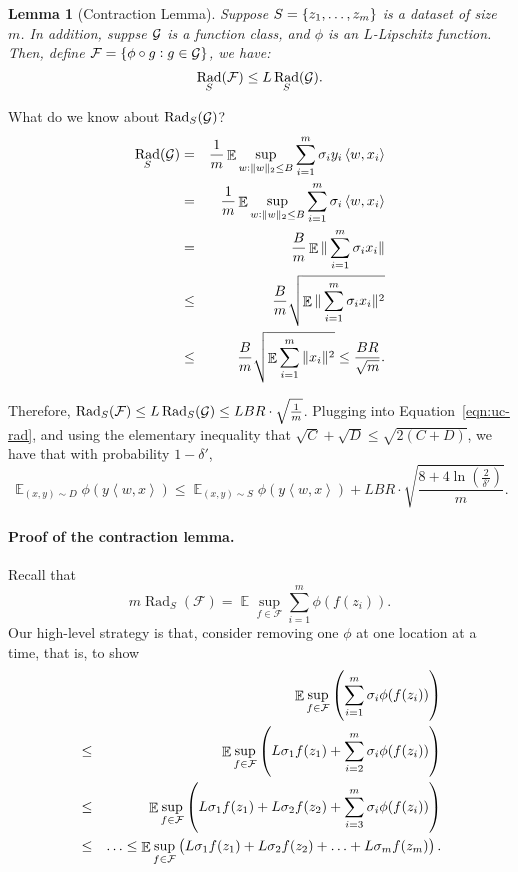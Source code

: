 \documentclass{article}
\newtheorem{lemma}{Lemma}
\DeclareMathOperator{\Rad}{{\mathrm{Rad}}}
\DeclareMathOperator*{\R}{{\rm R}}
\DeclareMathOperator*{\Gcal}{{\cal G}}
\DeclareMathOperator*{\EE}{{\mathbb E}}
\newcommand{\Fcal}{\mathcal{F}}
\newcommand{\inner}[2]{\left\langle #1,#2 \right\rangle}
\begin{document}
\begin{lemma}[Contraction Lemma]
Suppose $S = \cbr{z_1,\ldots,z_m}$ is a dataset of size $m$. In addition, suppse $\Gcal$ is a function class, and $\phi$ is an $L$-Lipschitz function. Then, define $\Fcal = \cbr{\phi \circ g: g \in \Gcal}$, we have:
\[ \Rad_S(\Fcal) \leq L \Rad_S(\Gcal). \]
\end{lemma}

What do we know about $\Rad_S(\Gcal)$?
\begin{eqnarray*}
\Rad_S(\Gcal)
&=& \frac{1}{m} \EE \sup_{w: \|w\|_2 \leq B} \sum_{i=1}^m \sigma_i y_i \inner{w}{x_i} \\
&=& \frac{1}{m} \EE \sup_{w: \|w\|_2 \leq B} \sum_{i=1}^m \sigma_i \inner{w}{x_i} \\
&=& \frac{B}{m} \EE \| \sum_{i=1}^m \sigma_i x_i \| \\
&\leq& \frac{B}{m} \sqrt{\EE \| \sum_{i=1}^m \sigma_i x_i \|^2} \\
&\leq& \frac{B}{m} \sqrt{\EE \sum_{i=1}^m \| x_i \|^2} \leq \frac{BR}{\sqrt{m}}.
\end{eqnarray*}

Therefore, $\Rad_S(\Fcal) \leq L \Rad_S(\Gcal) \leq LBR \cdot \sqrt{\frac1m}$. Plugging into Equation~\eqref{eqn:uc-rad}, and using the elementary inequality that $\sqrt{C}+\sqrt{D} \leq \sqrt{2(C+D)}$, we have that with probability $1-\delta'$,
\begin{equation}
\EE_{(x,y) \sim D} \phi(y \inner{w}{x})
\leq \EE_{(x,y) \sim S} \phi(y \inner{w}{x})
+ L B R \cdot \sqrt{\frac{8 + 4\ln(\frac{2}{\delta'})}{m}}.
\label{eqn:uc-lip}
\end{equation}



\paragraph{Proof of the contraction lemma.} Recall that
\[ m \Rad_S(\Fcal) = \EE \sup_{f \in \Fcal} \sum_{i=1}^m \phi(f(z_i)). \]
Our high-level strategy is that, consider removing one $\phi$ at one location at a time, that is, to show
\begin{eqnarray*}
  && \EE \sup_{f \in \Fcal} \del{\sum_{i=1}^m \sigma_i \phi(f(z_i))}\\
  &\leq& \EE \sup_{f \in \Fcal} \del{L \sigma_1 f(z_1) + \sum_{i=2}^m \sigma_i \phi(f(z_i))}\\
   &\leq& \EE \sup_{f \in \Fcal} \del{L \sigma_1 f(z_1) + L \sigma_2 f(z_2) + \sum_{i=3}^m \sigma_i \phi(f(z_i))} \\
  &\leq& \ldots \leq \EE \sup_{f \in \Fcal} \del{L \sigma_1 f(z_1) + L \sigma_2 f(z_2) + \ldots + L \sigma_m f(z_m)}.
\end{eqnarray*}
\end{document}
